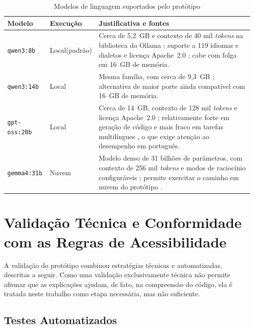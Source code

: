 \documentclass[
    12pt,                   %
    openright,              %
    oneside,                %
    a4paper,                %
    sumario=tradicional,    %
    english,                %
    brazil,                 %
    ]{abntex2}
\begin{document}
\begin{table}[htbp]
  \centering
  \caption{Modelos de linguagem suportados pelo protótipo}
  \label{tab:modelos}
  \begin{tabular}{p{2.5cm}p{2.2cm}p{7.6cm}}
    \toprule
    \textbf{Modelo} & \textbf{Execução} & \textbf{Justificativa e fontes} \\
    \midrule
    \texttt{qwen3:8b} & Local\newline (padrão) & Cerca de 5,2~GB e contexto de 40 mil \textit{tokens} na biblioteca do Ollama \cite{ollama2026qwen3}; suporte a 119 idiomas e dialetos e licença Apache~2.0 \cite{yang2025qwen3}; cabe com folga em 16~GB de memória. \\
    \texttt{qwen3:14b} & Local & Mesma família, com cerca de 9,3~GB \cite{ollama2026qwen3}; alternativa de maior porte ainda compatível com 16~GB de memória. \\
    \texttt{gpt-oss:20b} & Local & Cerca de 14~GB, contexto de 128 mil \textit{tokens} e licença Apache~2.0 \cite{ollama2026gptoss}; relativamente forte em geração de código e mais fraco em tarefas multilíngues \cite{bi2025gptoss}, o que exige atenção ao desempenho em português. \\
    \texttt{gemma4:31b} & Nuvem & Modelo denso de 31 bilhões de parâmetros, com contexto de 256 mil \textit{tokens} e modos de raciocínio configuráveis \cite{ollama2026gemma4}; permite exercitar o caminho em nuvem do protótipo \cite{ollama2026nuvem}. \\
    \bottomrule
  \end{tabular}
\end{table}

\section{Validação Técnica e Conformidade com as Regras de Acessibilidade}\label{sec:validacao}

A validação do protótipo combinou estratégias técnicas e automatizadas, descritas a seguir. Como uma validação exclusivamente técnica não permite afirmar que as explicações ajudam, de fato, na compreensão do código, ela é tratada neste trabalho como etapa necessária, mas não suficiente.

\subsection{Testes Automatizados}
\end{document}
